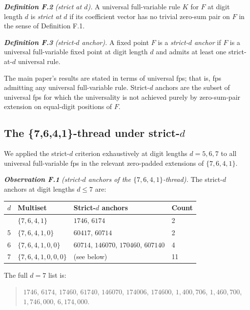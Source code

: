 \documentclass[11pt,letterpaper]{article}
\theoremstyle{paperstyle}
\theoremstyle{paperstyledef}
\theoremstyle{paperstylerem}
\begin{document}
\textbf{\emph{Definition F.2}} \emph{(strict at \(d\)).} A universal
full-variable rule \(K\) for \(F\) at digit length \(d\) is \emph{strict
at \(d\)} if its coefficient vector has no trivial zero-sum pair on
\(F\) in the sense of Definition F.1.

\textbf{\emph{Definition F.3}} \emph{(strict-\(d\) anchor).} A fixed
point \(F\) is a \emph{strict-\(d\) anchor} if \(F\) is a universal
full-variable fixed point at digit length \(d\) and admits at least one
strict-at-\(d\) universal rule.

The main paper's results are stated in terms of universal fps; that is,
fps admitting any universal full-variable rule. Strict-\(d\) anchors are
the subset of universal fps for which the universality is not achieved
purely by zero-sum-pair extension on equal-digit positions of \(F\).

\hypertarget{f.3-the-7641-thread-under-strict-d}{%
\subsection{\texorpdfstring{The \{7,6,4,1\}-thread under strict-\(d\)}{The \{7,6,4,1\}-thread under strict-d}}\label{f.3-the-7641-thread-under-strict-d}}

We applied the strict-\(d\) criterion exhaustively at digit lengths
\(d = 5, 6, 7\) to all universal full-variable fps in the relevant
zero-padded extensions of \(\{7, 6, 4, 1\}\).

\textbf{\emph{Observation F.1}} \emph{(strict-\(d\) anchors of the
\(\{7, 6, 4, 1\}\)-thread).} The strict-\(d\) anchors at digit lengths
\(d \leq 7\) are:

\begin{longtable}[]{@{}llll@{}}
\toprule\noalign{}
\(d\) & Multiset & Strict-\(d\) anchors & Count \\
\midrule\noalign{}
\endhead
\bottomrule\noalign{}
\endlastfoot
4 & \(\{7,6,4,1\}\) & \(1746\), \(6174\) & 2 \\
5 & \(\{7,6,4,1,0\}\) & \(60417\), \(60714\) & 2 \\
6 & \(\{7,6,4,1,0,0\}\) & \(60714\), \(146070\), \(170460\), \(607140\)
& 4 \\
7 & \(\{7,6,4,1,0,0,0\}\) & (see below) & 11 \\
\end{longtable}

The full \(d = 7\) list is:

\begin{quote}
\(1746\), \(6174\), \(17460\), \(61740\), \(146070\), \(174006\),
\(174600\), \(1{,}400{,}706\), \(1{,}460{,}700\), \(1{,}746{,}000\),
\(6{,}174{,}000\).
\end{quote}
\end{document}
